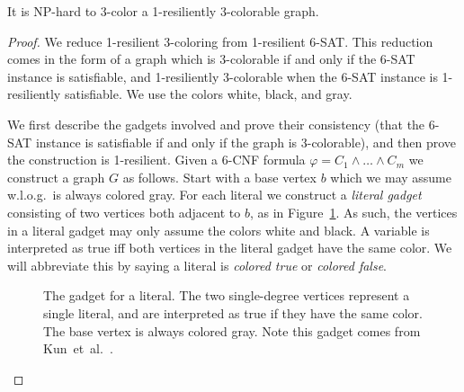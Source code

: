 \begin{theorem}\label{theorem:3-1}
It is NP-hard to 3-color a 1-resiliently 3-colorable graph.
\end{theorem}
\begin{proof}

We reduce 1-resilient 3-coloring from 1-resilient 6-SAT. This reduction comes
in the form of a graph which is 3-colorable if and only if the 6-SAT instance
is satisfiable, and 1-resiliently 3-colorable when the 6-SAT instance is
1-resiliently satisfiable. We use the colors white, black, and gray.

We first describe the gadgets involved and prove their consistency (that the
6-SAT instance is satisfiable if and only if the graph is 3-colorable), and
then prove the construction is 1-resilient. Given a 6-CNF formula $\varphi =
C_1 \wedge \dots \wedge C_m$ we construct a graph $G$ as follows. Start with a
base vertex $b$ which we may assume w.l.o.g.\ is always colored gray. For each
literal we construct a \emph{literal gadget} consisting of two vertices both
adjacent to $b$, as in Figure~\ref{fig:literal-gadget}. As such, the vertices
in a literal gadget may only assume the colors white and black. A variable is
interpreted as true iff both vertices in the literal gadget have the same
color. We will abbreviate this by saying a literal is \emph{colored true} or
\emph{colored false}.


\begin{figure}
{}
\caption{The gadget for a literal. The two single-degree vertices represent a
single literal, and are interpreted as true if they have the same color. The
base vertex is always colored gray. Note this gadget comes from
Kun~et~al.~\cite{KunPR13}.}
\label{fig:literal-gadget}
\end{figure}



\end{proof}
